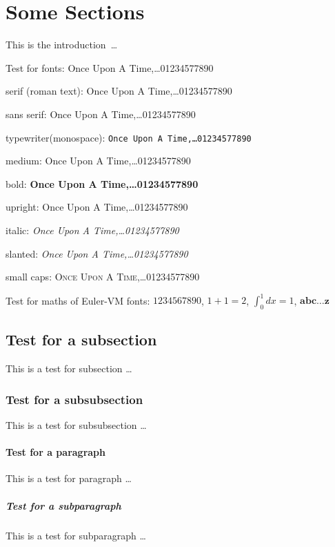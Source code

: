 \section{Some Sections}
\label{sec:sections}
This is the introduction~\cite{scipaper1, latex}\ldots
\vspace{1em}

Test for fonts: Once Upon A Time,\ldots 01234577890
\vspace{1em}

serif (roman text): 
\textrm{Once Upon A Time,\ldots 01234577890} %
\vspace{1em}

sans serif: 
\textsf{Once Upon A Time,\ldots 01234577890} %
\vspace{1em}

typewriter(monospace): 
\texttt{Once Upon A Time,\ldots 01234577890} %
\vspace{1em}

medium: 
\textmd{Once Upon A Time,\ldots 01234577890} %
\vspace{1em}

bold:
\textbf{Once Upon A Time,\ldots 01234577890} %
\vspace{1em}

upright:
\textup{Once Upon A Time,\ldots 01234577890} %
\vspace{1em}

italic:
\textit{Once Upon A Time,\ldots 01234577890} %
\vspace{1em}

slanted:
\textsl{Once Upon A Time,\ldots 01234577890} %
\vspace{1em}

small caps:
\textsc{Once Upon A Time,\ldots 01234577890} %
\vspace{2em}

Test for maths of Euler-VM fonts:
$1234567890$, $1+1=2$,  $\int_0^1 dx = 1$, $\mathbold{abc\ldots z}$

\subsection{Test for a subsection} 
This is a test for subsection \ldots

\subsubsection{Test for a subsubsection}
This is a test for subsubsection \ldots 

\paragraph{Test for a paragraph} 
This is a test for paragraph \ldots

\subparagraph{Test for a subparagraph} 
This is a test for subparagraph \ldots 
